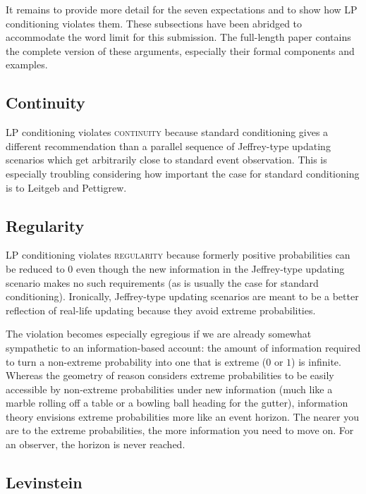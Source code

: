 \documentclass[11pt]{article} \usepackage{october} \onehalfspacing
\begin{document}
It remains to provide more detail for the seven expectations and to
show how LP conditioning violates them. These subsections have been
abridged to accommodate the word limit for this submission. The
full-length paper contains the complete version of these arguments,
especially their formal components and examples.

\subsection{Continuity}
\label{Continuity}

LP conditioning violates \textsc{continuity} because standard
conditioning gives a different recommendation than a parallel sequence
of Jeffrey-type updating scenarios which get arbitrarily close to
standard event observation. This is especially troubling considering
how important the case for standard conditioning is to Leitgeb and
Pettigrew.

\subsection{Regularity}
\label{Regularity}

LP conditioning violates \textsc{regularity} because formerly positive
probabilities can be reduced to $0$ even though the new information in
the Jeffrey-type updating scenario makes no such requirements (as is
usually the case for standard conditioning). Ironically, Jeffrey-type
updating scenarios are meant to be a better reflection of real-life
updating because they avoid extreme probabilities.

The violation becomes especially egregious if we are already somewhat
sympathetic to an information-based account: the amount of information
required to turn a non-extreme probability into one that is extreme
($0$ or $1$) is infinite. Whereas the geometry of reason considers
extreme probabilities to be easily accessible by non-extreme
probabilities under new information (much like a marble rolling off a
table or a bowling ball heading for the gutter), information theory
envisions extreme probabilities more like an event horizon. The nearer
you are to the extreme probabilities, the more information you need to
move on. For an observer, the horizon is never reached.

\subsection{Levinstein}
\label{Levinstein}
\end{document}
